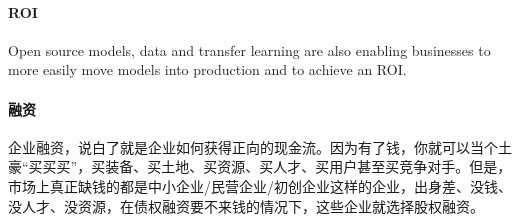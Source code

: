 \documentclass[letterpaper,11pt,english]{sphinxmanual}
\begin{document}
\paragraph{ROI}
\label{\detokenize{chapter_introduction/money:roi}}
Open source models, data and transfer learning are also enabling
businesses to more easily move models into production and to achieve an
ROI.


\paragraph{融资}
\label{\detokenize{chapter_introduction/money:id20}}
企业融资，说白了就是企业如何获得正向的现金流。因为有了钱，你就可以当个土豪“买买买”，买装备、买土地、买资源、买人才、买用户甚至买竞争对手。但是，市场上真正缺钱的都是中小企业/民营企业/初创企业这样的企业，出身差、没钱、没人才、没资源，在债权融资要不来钱的情况下，这些企业就选择股权融资。
\end{document}
